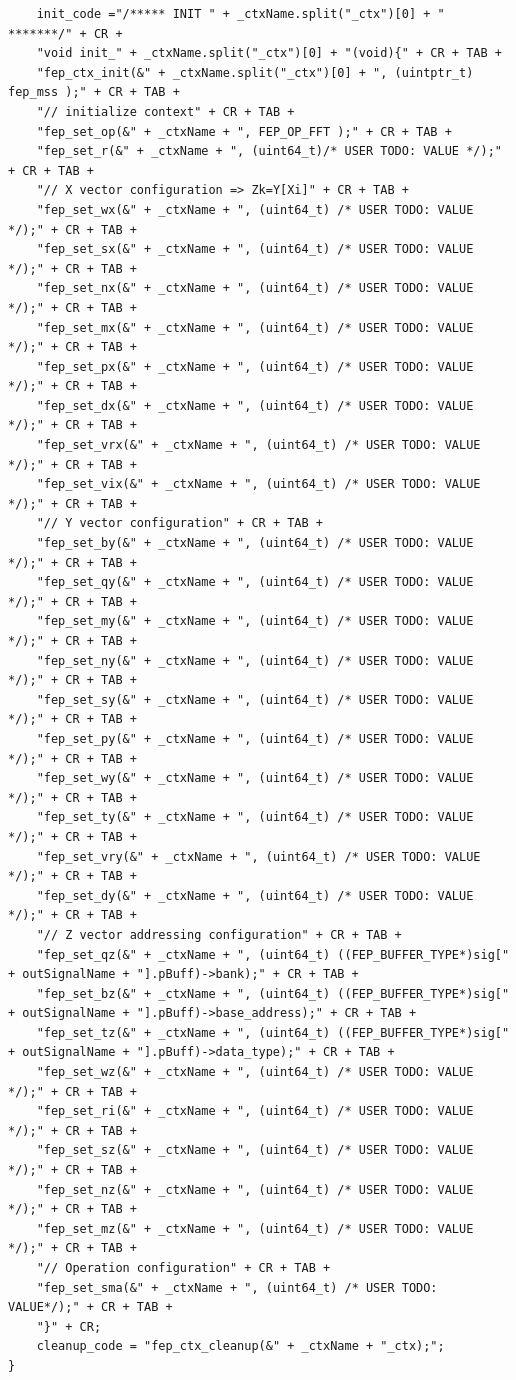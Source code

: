 \documentclass{llncs}
\begin{document}
\begin{lstlisting}
	init_code ="/***** INIT " + _ctxName.split("_ctx")[0] + " *******/" + CR +
	"void init_" + _ctxName.split("_ctx")[0] + "(void){" + CR + TAB +
	"fep_ctx_init(&" + _ctxName.split("_ctx")[0] + ", (uintptr_t) fep_mss );" + CR + TAB +
	"// initialize context" + CR + TAB +
	"fep_set_op(&" + _ctxName + ", FEP_OP_FFT );" + CR + TAB +
	"fep_set_r(&" + _ctxName + ", (uint64_t)/* USER TODO: VALUE */);" + CR + TAB +
	"// X vector configuration => Zk=Y[Xi]" + CR + TAB +
	"fep_set_wx(&" + _ctxName + ", (uint64_t) /* USER TODO: VALUE */);" + CR + TAB +
	"fep_set_sx(&" + _ctxName + ", (uint64_t) /* USER TODO: VALUE */);" + CR + TAB +
	"fep_set_nx(&" + _ctxName + ", (uint64_t) /* USER TODO: VALUE */);" + CR + TAB +
	"fep_set_mx(&" + _ctxName + ", (uint64_t) /* USER TODO: VALUE */);" + CR + TAB +
	"fep_set_px(&" + _ctxName + ", (uint64_t) /* USER TODO: VALUE */);" + CR + TAB +
	"fep_set_dx(&" + _ctxName + ", (uint64_t) /* USER TODO: VALUE */);" + CR + TAB +
	"fep_set_vrx(&" + _ctxName + ", (uint64_t) /* USER TODO: VALUE */);" + CR + TAB +
	"fep_set_vix(&" + _ctxName + ", (uint64_t) /* USER TODO: VALUE */);" + CR + TAB +
	"// Y vector configuration" + CR + TAB +
	"fep_set_by(&" + _ctxName + ", (uint64_t) /* USER TODO: VALUE */);" + CR + TAB +
	"fep_set_qy(&" + _ctxName + ", (uint64_t) /* USER TODO: VALUE */);" + CR + TAB +
	"fep_set_my(&" + _ctxName + ", (uint64_t) /* USER TODO: VALUE */);" + CR + TAB +
	"fep_set_ny(&" + _ctxName + ", (uint64_t) /* USER TODO: VALUE */);" + CR + TAB +
	"fep_set_sy(&" + _ctxName + ", (uint64_t) /* USER TODO: VALUE */);" + CR + TAB +
	"fep_set_py(&" + _ctxName + ", (uint64_t) /* USER TODO: VALUE */);" + CR + TAB +
	"fep_set_wy(&" + _ctxName + ", (uint64_t) /* USER TODO: VALUE */);" + CR + TAB +
	"fep_set_ty(&" + _ctxName + ", (uint64_t) /* USER TODO: VALUE */);" + CR + TAB +
	"fep_set_vry(&" + _ctxName + ", (uint64_t) /* USER TODO: VALUE */);" + CR + TAB +
	"fep_set_dy(&" + _ctxName + ", (uint64_t) /* USER TODO: VALUE */);" + CR + TAB +
	"// Z vector addressing configuration" + CR + TAB +
	"fep_set_qz(&" + _ctxName + ", (uint64_t) ((FEP_BUFFER_TYPE*)sig[" + outSignalName + "].pBuff)->bank);" + CR + TAB +
	"fep_set_bz(&" + _ctxName + ", (uint64_t) ((FEP_BUFFER_TYPE*)sig[" + outSignalName + "].pBuff)->base_address);" + CR + TAB +
	"fep_set_tz(&" + _ctxName + ", (uint64_t) ((FEP_BUFFER_TYPE*)sig[" + outSignalName + "].pBuff)->data_type);" + CR + TAB +
	"fep_set_wz(&" + _ctxName + ", (uint64_t) /* USER TODO: VALUE */);" + CR + TAB +
	"fep_set_ri(&" + _ctxName + ", (uint64_t) /* USER TODO: VALUE */);" + CR + TAB +
	"fep_set_sz(&" + _ctxName + ", (uint64_t) /* USER TODO: VALUE */);" + CR + TAB +
	"fep_set_nz(&" + _ctxName + ", (uint64_t) /* USER TODO: VALUE */);" + CR + TAB +
	"fep_set_mz(&" + _ctxName + ", (uint64_t) /* USER TODO: VALUE */);" + CR + TAB +
	"// Operation configuration" + CR + TAB +
	"fep_set_sma(&" + _ctxName + ", (uint64_t) /* USER TODO: VALUE*/);" + CR + TAB +
	"}" + CR;
	cleanup_code = "fep_ctx_cleanup(&" + _ctxName + "_ctx);";
}
\end{lstlisting}
%
%
%
\end{document}
